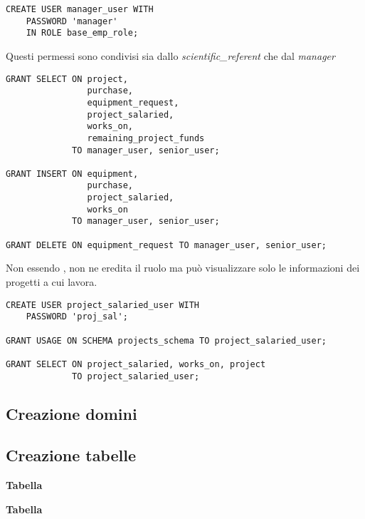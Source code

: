 \begin{lstlisting}
CREATE USER manager_user WITH
	PASSWORD 'manager'
	IN ROLE base_emp_role;	
\end{lstlisting}\medskip
Questi permessi sono condivisi sia dallo \textit{scientific\_referent} che dal \textit{manager}
\begin{lstlisting}
GRANT SELECT ON project,  
                purchase,  
                equipment_request,  
                project_salaried,  
                works_on, 
                remaining_project_funds 
             TO manager_user, senior_user;

GRANT INSERT ON equipment, 
                purchase, 
                project_salaried, 
                works_on 
             TO manager_user, senior_user;

GRANT DELETE ON equipment_request TO manager_user, senior_user;
\end{lstlisting}
Non essendo \textit{\baseemp}, non ne eredita il ruolo ma può visualizzare solo le informazioni dei progetti a cui lavora.
\begin{lstlisting}
CREATE USER project_salaried_user WITH
	PASSWORD 'proj_sal';

GRANT USAGE ON SCHEMA projects_schema TO project_salaried_user;

GRANT SELECT ON project_salaried, works_on, project
             TO project_salaried_user;
\end{lstlisting}

\subsection{Creazione domini}








\newpage
\subsection{Creazione tabelle}
\noindent \textbf{Tabella \baseemp}
\bigskip

\noindent \textbf{Tabella \careerlog}
\bigskip

